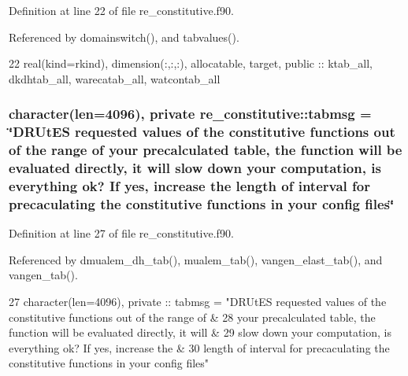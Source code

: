 Definition at line 22 of file re\+\_\+constitutive.\+f90.



Referenced by domainswitch(), and tabvalues().


\begin{DoxyCode}
22   \textcolor{keywordtype}{real(kind=rkind)}, \textcolor{keywordtype}{dimension(:,:,:)}, \textcolor{keywordtype}{allocatable}, \textcolor{keywordtype}{target}, \textcolor{keywordtype}{public} :: ktab_all, 
      dkdhtab_all, warecatab_all, watcontab_all
\end{DoxyCode}
\subsubsection[{tabmsg}]{\setlength{\rightskip}{0pt plus 5cm}character(len=4096), private re\+\_\+constitutive\+::tabmsg = \char`\"{}D\+R\+Ut\+ES requested values of the constitutive functions out of the range of your precalculated table, the function will be evaluated directly, it will slow down your computation, is everything ok? If yes, increase the length of interval for precaculating the constitutive functions in your config files\char`\"{}\hspace{0.3cm}{\ttfamily [private]}}\label{namespacere__constitutive_a44ecaf75690494449561f9c55f1a142d}


Definition at line 27 of file re\+\_\+constitutive.\+f90.



Referenced by dmualem\+\_\+dh\+\_\+tab(), mualem\+\_\+tab(), vangen\+\_\+elast\+\_\+tab(), and vangen\+\_\+tab().


\begin{DoxyCode}
27   \textcolor{keywordtype}{character(len=4096)}, \textcolor{keywordtype}{private} :: tabmsg = \textcolor{stringliteral}{"DRUtES requested values of the constitutive functions out of
       the range of &}
28 \textcolor{stringliteral}{}\textcolor{stringliteral}{                                            your precalculated table, the function will be evaluated
       directly, it will & }
29 \textcolor{stringliteral}{}\textcolor{stringliteral}{                                            slow down your computation, is everything ok? If yes, increase
       the &}
30 \textcolor{stringliteral}{}\textcolor{stringliteral}{                                            length of interval for precaculating the constitutive functions
       in your config files"}   
\end{DoxyCode}
